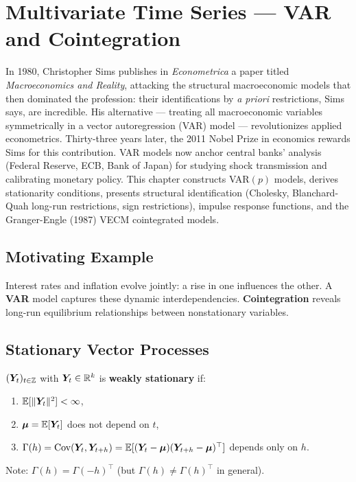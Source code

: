 \chapter{Multivariate Time Series --- VAR and Cointegration}
\label{ch:var}

In 1980, Christopher Sims publishes in \emph{Econometrica} a paper titled \emph{Macroeconomics and Reality}, attacking the structural macroeconomic models that then dominated the profession: their identifications by \emph{a priori} restrictions, Sims says, are \og{}incredible\fg{}. His alternative --- treating all macroeconomic variables symmetrically in a vector autoregression (VAR) model --- revolutionizes applied econometrics. Thirty-three years later, the 2011 Nobel Prize in economics rewards Sims for this contribution. VAR models now anchor central banks' analysis (Federal Reserve, ECB, Bank of Japan) for studying shock transmission and calibrating monetary policy. This chapter constructs VAR$(p)$ models, derives stationarity conditions, presents structural identification (Cholesky, Blanchard-Quah long-run restrictions, sign restrictions), impulse response functions, and the Granger-Engle (1987) VECM cointegrated models.

\section{Motivating Example}
Interest rates and inflation evolve jointly: a rise in one influences the other. A \textbf{VAR} model captures these dynamic interdependencies. \textbf{Cointegration} reveals long-run equilibrium relationships between nonstationary variables.

\section{Stationary Vector Processes}

\begin{definition}
$(\bm{Y}_t)_{t\in\mathbb{Z}}$ with $\bm{Y}_t\in\mathbb{R}^k$ is \textbf{weakly stationary} if:
\begin{enumerate}
\item $\mathbb{E}[\|\bm{Y}_t\|^2]<\infty$,
\item $\bm\mu = \mathbb{E}[\bm{Y}_t]$ does not depend on $t$,
\item $\Gamma(h) = \operatorname{Cov}(\bm{Y}_t,\bm{Y}_{t+h}) = \mathbb{E}[(\bm{Y}_t-\bm\mu)(\bm{Y}_{t+h}-\bm\mu)^\top]$ depends only on $h$.
\end{enumerate}
Note: $\Gamma(h)=\Gamma(-h)^\top$ (but $\Gamma(h)\neq\Gamma(h)^\top$ in general).
\end{definition}

